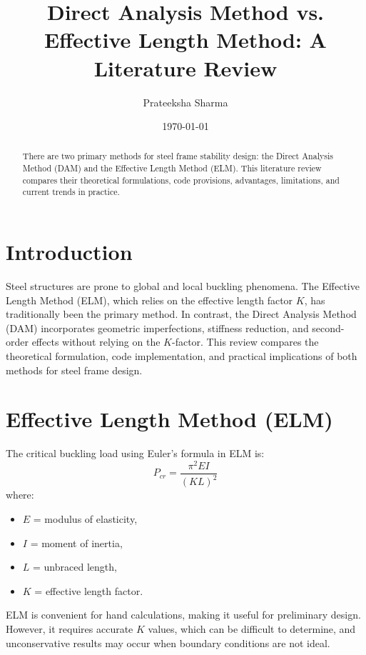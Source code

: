 \documentclass[12pt,a4paper]{article}
\title{Direct Analysis Method vs. Effective Length Method: A Literature Review}
\author{Prateeksha Sharma}
\date{\today}
\begin{document}
\maketitle

\begin{abstract}
There are two primary methods for steel frame stability design: the Direct Analysis Method (DAM) and the Effective Length Method (ELM). This literature review compares their theoretical formulations, code provisions, advantages, limitations, and current trends in practice.
\end{abstract}

\section{Introduction}
Steel structures are prone to global and local buckling phenomena. The Effective Length Method (ELM), which relies on the effective length factor $K$, has traditionally been the primary method. In contrast, the Direct Analysis Method (DAM) incorporates geometric imperfections, stiffness reduction, and second-order effects without relying on the $K$-factor. This review compares the theoretical formulation, code implementation, and practical implications of both methods for steel frame design.

\section{Effective Length Method (ELM)}
The critical buckling load using Euler's formula in ELM is:
\begin{equation}
P_{cr} = \frac{\pi^2 E I}{(K L)^2}
\end{equation}
where:  
\begin{itemize}
    \item $E$ = modulus of elasticity,  
    \item $I$ = moment of inertia,  
    \item $L$ = unbraced length,  
    \item $K$ = effective length factor.  
\end{itemize}

ELM is convenient for hand calculations, making it useful for preliminary design. However, it requires accurate $K$ values, which can be difficult to determine, and unconservative results may occur when boundary conditions are not ideal.
\end{document}
